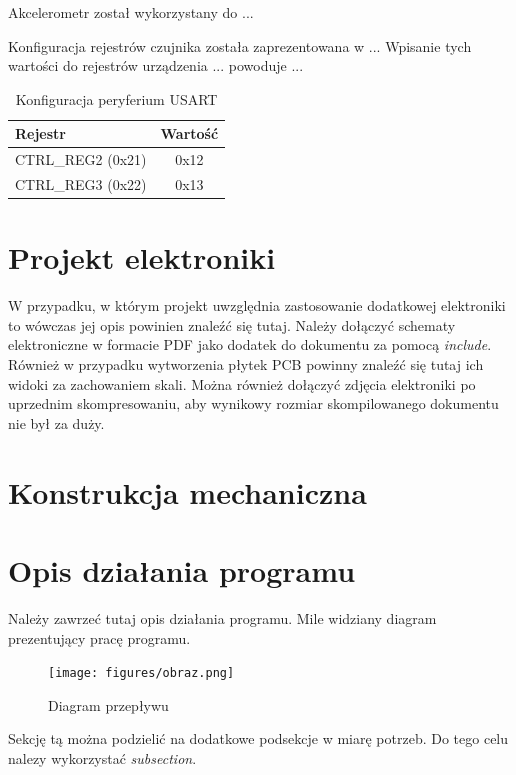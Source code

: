 \documentclass[10pt, a4paper]{article}
\begin{document}
Akcelerometr został wykorzystany do ...

Konfiguracja rejestrów czujnika została zaprezentowana w ...
Wpisanie tych wartości do rejestrów urządzenia ... powoduje ...

\begin{table}[H]
	\centering
	\begin{tabular}{|l|c|} \hline
		\textbf{Rejestr} & Wartość \\
		\hline
		\hline
		CTRL\_REG2 (0x21) & 0x12\\\hline
		CTRL\_REG3 (0x22) & 0x13\\\hline
	\end{tabular}
	\caption{Konfiguracja peryferium USART}
	\label{tab:Akcelerometr}
\end{table}

\section{Projekt elektroniki}



W przypadku, w którym projekt uwzględnia zastosowanie 
dodatkowej elektroniki to wówczas jej opis powinien znaleźć się tutaj.
Należy dołączyć schematy elektroniczne w formacie PDF 
jako dodatek do dokumentu 
za pomocą \textit{include}. Również w przypadku wytworzenia 
płytek PCB powinny znaleźć się tutaj ich widoki za zachowaniem skali.
Można również dołączyć zdjęcia 
elektroniki po uprzednim skompresowaniu, aby wynikowy rozmiar 
skompilowanego dokumentu nie był za duży.
\section{Konstrukcja mechaniczna}
\section{Opis działania programu}

Należy zawrzeć tutaj opis działania programu.
Mile widziany diagram prezentujący pracę programu.

\begin{figure}[H]
	\centering
	\texttt{[image: figures/obraz.png]}
	\caption{Diagram przepływu}
	\label{fig:Program}
\end{figure}

Sekcję tą można podzielić na dodatkowe podsekcje w miarę potrzeb. 
Do tego celu nalezy wykorzystać \textit{subsection}.
\end{document}
